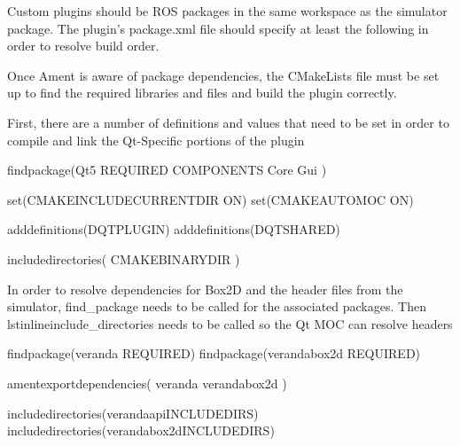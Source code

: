 \documentclass[letterpaper,10pt,english]{sphinxmanual}
\begin{document}

Custom plugins should be ROS packages in the same workspace as the simulator package. The plugin’s package.xml file should specify at least the following in order
to resolve build order.

%
\begin{sphinxVerbatim}[commandchars=\\\{\}]
\end{sphinxVerbatim}

Once Ament is aware of package dependencies, the CMakeLists file must be set up to find the required libraries and files and build the plugin correctly.

First, there are a number of definitions and values that need to be set in order to compile and link the Qt-Specific portions of the plugin

%
\begin{sphinxVerbatim}[commandchars=\\\{\}]
find\PYGZus{}package(Qt5 REQUIRED COMPONENTS
Core Gui
)

set(CMAKE\PYGZus{}INCLUDE\PYGZus{}CURRENT\PYGZus{}DIR ON)
set(CMAKE\PYGZus{}AUTOMOC ON)

add\PYGZus{}definitions(\PYGZhy{}DQT\PYGZus{}PLUGIN)
add\PYGZus{}definitions(\PYGZhy{}DQT\PYGZus{}SHARED)

include\PYGZus{}directories( \PYGZdl{}\PYGZob{}CMAKE\PYGZus{}BINARY\PYGZus{}DIR\PYGZcb{} )
\end{sphinxVerbatim}

In order to resolve dependencies for Box2D and the header files from the simulator, find\_package needs to be called for the associated packages. Then lstinline\textbar{}include\_directories\textbar{} needs to be called so the Qt MOC can resolve headers

%
\begin{sphinxVerbatim}[commandchars=\\\{\}]
find\PYGZus{}package(veranda REQUIRED)
find\PYGZus{}package(veranda\PYGZus{}box2d REQUIRED)

ament\PYGZus{}export\PYGZus{}dependencies(
        veranda
        veranda\PYGZus{}box2d
)

include\PYGZus{}directories(\PYGZdl{}\PYGZob{}veranda\PYGZus{}api\PYGZus{}INCLUDE\PYGZus{}DIRS\PYGZcb{})
include\PYGZus{}directories(\PYGZdl{}\PYGZob{}veranda\PYGZus{}box2d\PYGZus{}INCLUDE\PYGZus{}DIRS\PYGZcb{})
\end{sphinxVerbatim}
\end{document}
